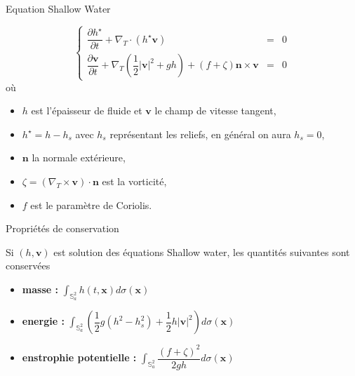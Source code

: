 \documentclass[11pt]{beamer}
\def\gint{\displaystyle\int}
\begin{document}

\begin{frame}{Equation Shallow Water}
\begin{block}{}
\begin{equation}
\left\lbrace
\begin{array}{rcl}
\dfrac{\partial h^{\star}}{\partial t} + \nabla_T \cdot \left( h^{\star} \mathbf{v} \right) & = & 0 \\
\dfrac{\partial \mathbf{v}}{\partial t} + \nabla_T \left( \dfrac{1}{2}|\mathbf{v}|^2 + gh \right) + \left( f + \zeta \right) \mathbf{n} \times \mathbf{v} & = & 0
\end{array}
\right.
\end{equation}
où  
\begin{itemize}
\item $h$ est l'épaisseur de fluide et $\mathbf{v}$ le champ de vitesse tangent,
\item $h^{\star}=h-h_s$ avec $h_s$ représentant les reliefs, en général on aura $h_s=0$,
\item $\mathbf{n}$ la normale extérieure, 
\item $\zeta = \left( \nabla_T \times \mathbf{v} \right) \cdot \mathbf{n}$ est la vorticité,
\item $f$ est le paramètre de Coriolis.
\end{itemize}
\end{block}
\end{frame}


\begin{frame}{Propriétés de conservation}
\begin{block}{}
Si $(h, \mathbf{v})$ est solution des équations Shallow water, les quantités suivantes sont conservées

\begin{itemize}
\item \textbf{masse :} 
$\gint_{\mathbb{S}^2_a} h(t, \mathbf{x}) d \sigma(\mathbf{x})$
\item \textbf{energie :}
$ \gint_{\mathbb{S}^2_a} \left( \dfrac{1}{2}g(h^2 - h_s^2) + \dfrac{1}{2} h | \mathbf{v} |^2 \right) d \sigma(\mathbf{x})$
\item \textbf{enstrophie potentielle :}
$\gint_{\mathbb{S}^2_a} \dfrac{\left( f + \zeta \right)^2}{2gh} d \sigma(\mathbf{x})$
\end{itemize}
\end{block}
\end{frame}
\end{document}
